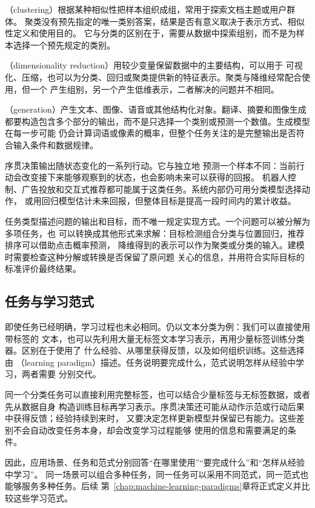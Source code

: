 （clustering）根据某种相似性把样本组织成组，常用于探索文档主题或用户群体。
聚类没有预先指定的唯一类别答案，结果是否有意义取决于表示方式、相似性定义和使用目的。
它与分类的区别在于，需要从数据中探索组别，而不是为样本选择一个预先规定的类别。

（dimensionality reduction）用较少变量保留数据中的主要结构，可以用于
可视化、压缩，也可以为分类、回归或聚类提供新的特征表示。聚类与降维经常配合使用，但一个
产生组别，另一个产生低维表示，二者解决的问题并不相同。

（generation）产生文本、图像、语音或其他结构化对象。翻译、摘要和图像生成
都要构造包含多个部分的输出，而不是只选择一个类别或预测一个数值。生成模型在每一步可能
仍会计算词语或像素的概率，但整个任务关注的是完整输出是否符合输入条件和数据规律。

序贯决策输出随状态变化的一系列行动。它与独立地
预测一个样本不同：当前行动会改变接下来能够观察到的状态，也会影响未来可以获得的回报。
机器人控制、广告投放和交互式推荐都可能属于这类任务。系统内部仍可用分类模型选择动作，
或用回归模型估计未来回报，但整体目标是提高一段时间内的累计收益。

任务类型描述问题的输出和目标，而不唯一规定实现方式。一个问题可以被分解为多项任务，也
可以转换成其他形式来求解：目标检测组合分类与位置回归，推荐排序可以借助点击概率预测，
降维得到的表示可以作为聚类或分类的输入。建模时需要检查这种分解或转换是否保留了原问题
关心的信息，并用符合实际目标的标准评价最终结果。

\subsection{任务与学习范式}
\label{sec:task-and-learning-paradigm}

即使任务已经明确，学习过程也未必相同。仍以文本分类为例：我们可以直接使用带标签的
文本，也可以先利用大量无标签文本学习表示，再用少量标签训练分类器。区别在于使用了
什么经验、从哪里获得反馈，以及如何组织训练。这些选择由
（learning paradigm）描述。任务说明要完成什么，范式说明怎样从经验中学习，两者需要
分别交代。

同一个分类任务可以直接利用完整标签，也可以结合少量标签与无标签数据，或者先从数据自身
构造训练目标再学习表示。序贯决策还可能从动作示范或行动后果中获得反馈；经验持续到来时，
又要决定怎样更新模型并保留已有能力。这些差别不会自动改变任务本身，却会改变学习过程能够
使用的信息和需要满足的条件。

因此，应用场景、任务和范式分别回答“在哪里使用”“要完成什么”和“怎样从经验中学习”。
同一场景可以组合多种任务，同一任务可以采用不同范式，同一范式也能够服务多种任务。后续
第~\ref{chap:machine-learning-paradigms}章将正式定义并比较这些学习范式。

